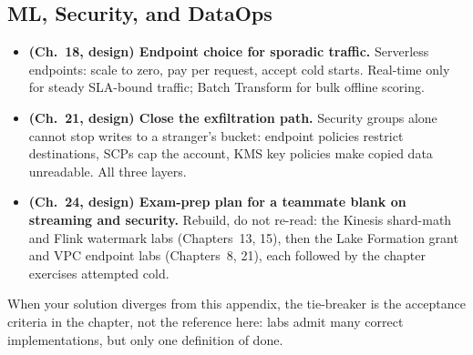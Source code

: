 \subsection{ML, Security, and DataOps}
\begin{itemize}
    \item \textbf{(Ch.~18, design) Endpoint choice for sporadic traffic.} Serverless endpoints:
    scale to zero, pay per request, accept cold starts. Real-time only for steady SLA-bound
    traffic; Batch Transform for bulk offline scoring.
    \item \textbf{(Ch.~21, design) Close the exfiltration path.} Security groups alone cannot
    stop writes to a stranger's bucket: endpoint policies restrict destinations, SCPs cap the
    account, KMS key policies make copied data unreadable. All three layers.
    \item \textbf{(Ch.~24, design) Exam-prep plan for a teammate blank on streaming and
    security.} Rebuild, do not re-read: the Kinesis shard-math and Flink watermark labs
    (Chapters~13, 15), then the Lake Formation grant and VPC endpoint labs (Chapters~8, 21),
    each followed by the chapter exercises attempted cold.
\end{itemize}

\begin{tipbox}
When your solution diverges from this appendix, the tie-breaker is the acceptance criteria in the
chapter, not the reference here: labs admit many correct implementations, but only one definition
of done.
\end{tipbox}
